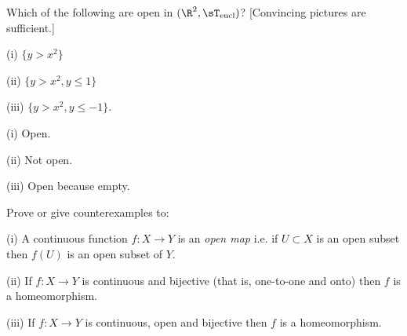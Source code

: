 \begin{problem}
Which of the following are open in $(\R^2, \sT_{\text{eucl}})$? [Convincing pictures are sufficient.]
\ben
\item [(i)] $\{y > x^2\}$
\item [(ii)] $\{y > x^2, y \leq 1\}$
\item [(iii)] $\{y > x^2, y \leq -1\}$.
\een
\end{problem}

\begin{solution}[\bf Solution.]
\ben
\item [(i)] Open.
\item [(ii)] Not open.
\item [(iii)] Open because empty.
\een
\end{solution}


\begin{problem}
Prove or give counterexamples to:
\ben
\item [(i)] A continuous function $f : X \to Y$ is an \emph{open map} i.e. if $U \subset X$ is an open subset then $f(U)$ is an open subset of $Y$.
\item [(ii)] If $f : X \to Y$ is continuous and bijective (that is, one-to-one and onto) then $f$ is a homeomorphism.
\item [(iii)] If $f : X \to Y$ is continuous, open and bijective then $f$ is a homeomorphism.
\een
\end{problem}

